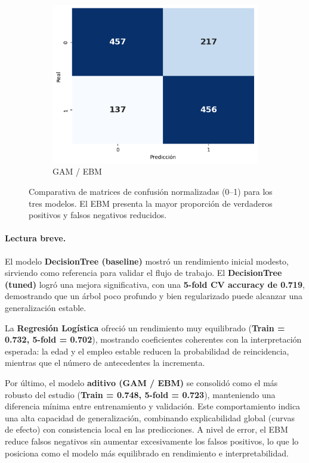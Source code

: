 \begin{figure}[h]
  \begin{subfigure}[t]{0.32\linewidth}
    \centering
    \includegraphics[width=\linewidth]{figures/ebm_cm.png}
    \caption{GAM / EBM}
    \label{fig:cm-gam}
  \end{subfigure}
  \caption{Comparativa de matrices de confusión normalizadas (0–1) para los tres modelos. El EBM presenta la mayor proporción de verdaderos positivos y falsos negativos reducidos.}
  \label{fig:cm-compare}
\end{figure}

\paragraph{Lectura breve.}
El modelo \textbf{DecisionTree (baseline)} mostró un rendimiento inicial modesto, sirviendo como referencia para validar el flujo de trabajo. 
El \textbf{DecisionTree (tuned)} logró una mejora significativa, con una \textbf{5-fold CV accuracy de 0.719}, demostrando que un árbol poco profundo y bien regularizado puede alcanzar una generalización estable.

La \textbf{Regresión Logística} ofreció un rendimiento muy equilibrado (\textbf{Train = 0.732, 5-fold = 0.702}), mostrando coeficientes coherentes con la interpretación esperada: la edad y el empleo estable reducen la probabilidad de reincidencia, mientras que el número de antecedentes la incrementa. 

Por último, el modelo \textbf{aditivo (GAM / EBM)} se consolidó como el más robusto del estudio (\textbf{Train = 0.748, 5-fold = 0.723}), manteniendo una diferencia mínima entre entrenamiento y validación. Este comportamiento indica una alta capacidad de generalización, combinando explicabilidad global (curvas de efecto) con consistencia local en las predicciones. A nivel de error, el EBM reduce falsos negativos sin aumentar excesivamente los falsos positivos, lo que lo posiciona como el modelo más equilibrado en rendimiento e interpretabilidad.
